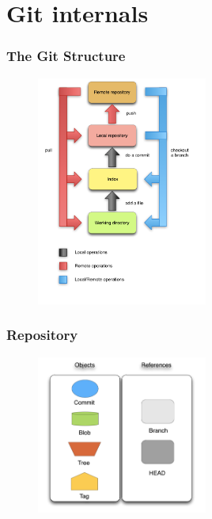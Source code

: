 \documentclass{beamer}
\begin{document}
\section{Git internals}

\begin{frame}
   \frametitle{The Git Structure}
   \begin{figure}
      \centering
      \includegraphics[width=0.5\textwidth]{images/git_workflow.png}
   \end{figure}
\end{frame}


\begin{frame}
\frametitle{Repository}
   \begin{figure}
      \centering
      \includegraphics[width=0.5\textwidth]{images/legenda2.png}
   \end{figure}
\end{frame}
\end{document}

